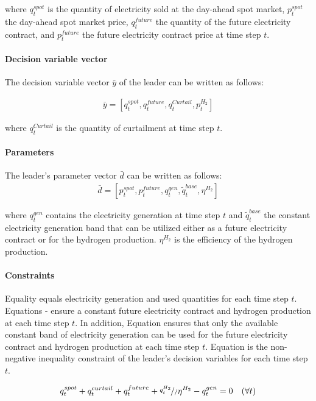 \documentclass[review]{elsarticle}
\begin{document}
where $q_{t}^{spot}$ is the quantity of electricity sold at the day-ahead spot market, $p_{t}^{spot}$ the day-ahead spot market price, $q_{t}^{future}$ the quantity of the future electricity contract, and $p_{t}^{future}$ the future electricity contract price at time step $t$.

\paragraph{Decision variable vector} The decision variable vector $\bar{y}$ of the leader can be written as follows:

\begin{align}
\bar{y}=[q_{t}^{spot},q_{t}^{future},q_{t}^{Curtail}, p_{t}^{H_2}]
\end{align}

where $q_{t}^{Curtail}$ is the quantity of curtailment at time step $t$.

\paragraph{Parameters}
The leader's parameter vector $\bar{d}$ can be written as follows:
\begin{align}
\bar{d}=[p_{t}^{spot},p_{t}^{future},q_{t}^{gen}, \tilde{q}_{t}^{base}, \eta^{H_2}]
\end{align}

where $q_{t}^{gen}$ contains the electricity generation at time step $t$ and $\tilde{q}_{t}^{base}$ the constant electricity generation band that can be utilized either as a future electricity contract or for the hydrogen production. $\eta^{H_2}$ is the efficiency of the hydrogen production. 

\paragraph{Constraints} Equality  equals electricity generation and used quantities for each time step $t$. Equations - ensure a constant future electricity contract and hydrogen production at each time step $t$. In addition, Equation  ensures that only the available constant band of electricity generation can be used for the future electricity contract and hydrogen production at each time step $t$. Equation  is the non-negative inequality constraint of the leader's decision variables for each time step $t$.

\begin{align}\label{L1}
	q_{t}^{spot} + q_{t}^{curtail} + q_{t}^{future} + \nicefrac{q_{t}^{H_2}}/{\eta^{H_2}} - q_{t}^{gen} = 0 \quad (\forall t)
\end{align}
\end{document}
